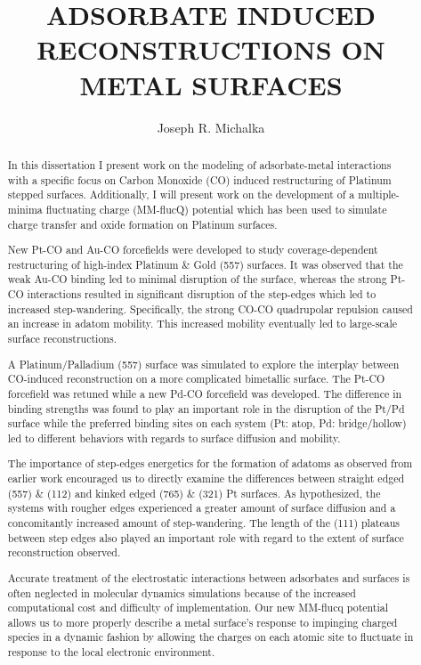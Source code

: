 \begin{abstract}
\title{ADSORBATE INDUCED RECONSTRUCTIONS ON METAL SURFACES}
\author{Joseph R. Michalka}
In this dissertation I present work on the modeling of adsorbate-metal
interactions with a specific focus on Carbon Monoxide (CO) induced
restructuring of Platinum stepped surfaces. Additionally, I will present work
on the development of a multiple-minima fluctuating charge (MM-flucQ) potential
which has been used to simulate charge transfer and oxide formation on Platinum
surfaces.

New Pt-CO and Au-CO forcefields were developed to study coverage-dependent
restructuring of high-index Platinum \& Gold (557) surfaces. It was observed
that the weak Au-CO binding led to minimal disruption of the surface, whereas
the strong Pt-CO interactions resulted in significant disruption of the
step-edges which led to increased step-wandering. Specifically, the strong
CO-CO quadrupolar repulsion caused an increase in adatom mobility. This
increased mobility eventually led to large-scale surface reconstructions.

A Platinum/Palladium (557) surface was simulated to explore the interplay
between CO-induced reconstruction on a more complicated bimetallic surface. The
Pt-CO forcefield was retuned while a new Pd-CO forcefield was developed.  The
difference in binding strengths was found to play an important role in the
disruption of the Pt/Pd surface while the preferred binding sites on each
system (Pt: atop, Pd: bridge/hollow) led to different behaviors with regards to
surface diffusion and mobility.

The importance of step-edges energetics for the formation of adatoms as
observed from earlier work encouraged us to directly examine the differences
between straight edged (557) \& (112) and kinked edged (765) \& (321) Pt
surfaces.  As hypothesized, the systems with rougher edges experienced a
greater amount of surface diffusion and a concomitantly increased amount of
step-wandering. The length of the (111) plateaus between step edges also played
an important role with regard to the extent of surface reconstruction observed.

Accurate treatment of the electrostatic interactions between adsorbates and
surfaces is often neglected in molecular dynamics simulations because of the
increased computational cost and difficulty of implementation.  Our new MM-flucq
potential allows us to more properly describe a metal surface's response to
impinging charged species in a dynamic fashion by allowing the charges on each
atomic site to fluctuate in response to the local electronic environment.
\end{abstract}

